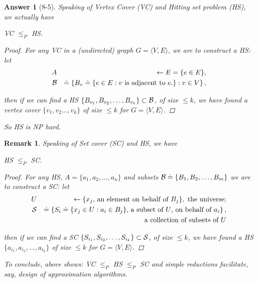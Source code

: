 \documentclass[11pt]{article}
\theoremstyle{numberplain}
\theoremstyle{nonumberplain}
\newtheorem{proof}{Proof}
\newtheorem{rem}{Remark}
\newtheorem{ans}{Answer}
\newcommand{\0}{{\mathbf{0}}}
\begin{document}
\begin{ans}[8-5] Speaking of Vertex Cover (VC) and Hitting set problem (HS), we actually have
\begin{claim}
VC $\leq_P$ HS.
\end{claim}
\begin{proof}
For any VC in a (undirected) graph $G=\langle V,E\rangle$, we are to construct a HS: let
\begin{eqnarray*}
A&& \leftarrow E=\{e\in E\}, \\
{\cal B}&& \doteq \left\{B_v\doteq\{e\in E: v \text{ is adjacent to }e.\}:v\in V \right\},
\end{eqnarray*}

then if we can find a HS $\left\{B_{v_1},B_{v_2},\ldots,B_{v_k}\right\}\subset {\cal B}$, of size $\leq k$, we have found a vertex cover $\{v_1,v_2\ldots,v_k\}$ of size $\leq k$ for $G=\langle V,E\rangle$.
\end{proof}
So HS is NP hard.
\end{ans}
\begin{rem} Speaking of Set cover (SC) and HS, we have 
\begin{claim}
HS $\leq_P$ SC.
\end{claim}
\begin{proof}
For any HS, $A=\{a_1,a_2,\ldots,a_n\}$ and subsets ${\cal B}\doteq \left\{B_1, B_2, \ldots, B_m\right\}$ we are to construct a SC: let
\begin{eqnarray*}
U&& \leftarrow \{x_j \text{, an element on behalf of }B_j\}, \text{ the universe}; 
\\
{\cal S}&& \doteq \left\{S_i\doteq\{x_j\in U: a_i\in B_j\}
\text{, a subset of }U \text{, on behalf of }a_i
\right\},\\
&& \text{ a collection of subsets of }U
\end{eqnarray*}

then if we can find a SC $\left\{S_{i_1},S_{i_2},\ldots,S_{i_k}\right\}\subset {\cal S}$, of size $\leq k$, we have found a HS $\{a_{i_1},a_{i_2},\ldots,a_{i_k}\}$ of size $\leq k$ for $G=\langle V,E\rangle$.
\end{proof}
To conclude, above shows: VC $\leq_P$ HS $\leq_P$ SC and simple reductions facilitate, say, design of approximation algorithms.
\end{rem}
\end{document}

